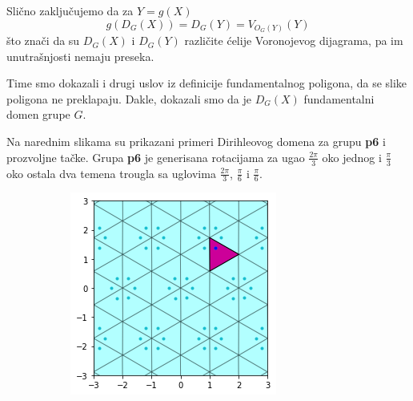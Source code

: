 \documentclass[11pt]{article}
\begin{document}
\noindent Sli\v cno zaklju\v cujemo da za $Y = g(X)$
$$g(D_G(X)) = D_G(Y) = V_{O_G(Y)}(Y)$$ \v sto zna\v ci da su $D_G(X)$ i $D_G(Y)$ razli\v cite \' celije Voronojevog dijagrama, pa im unutra\v snjosti nemaju preseka. 

Time smo dokazali i drugi uslov iz definicije fundamentalnog poligona, da se slike poligona ne preklapaju. Dakle, dokazali smo da je $D_G(X)$ fundamentalni domen grupe $G$.

Na narednim slikama su prikazani primeri Dirihleovog domena za grupu \textbf{p6} i prozvoljne ta\v cke. 
Grupa \textbf{p6} je generisana rotacijama za ugao \(\frac{2\pi}{3}\) oko jednog
i \(\frac{\pi}{3}\) oko ostala dva temena trougla sa uglovima \(\frac{2\pi}{3}\), \(\frac{\pi}{6}\) i \(\frac{\pi}{6}\).



  \begin{figure}[H]
  \begin{subfigure}[b]{0.3\textwidth}
    \includegraphics[width=\textwidth]{output_10_0.png}
    \label{fig:f1}
  \end{subfigure}
  \begin{subfigure}[b]{0.3\textwidth}

\end{subfigure}
\end{figure}
\end{document}
